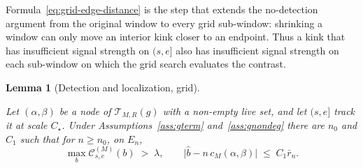 \documentclass[12pt, a4paper]{article}
\newtheorem{lemma}{Lemma}[section]
\begin{document}
Formula~\eqref{eq:grid-edge-distance} is the step that extends the no-detection
argument from the original window to every grid sub-window: shrinking a
window can only move an interior kink closer to an endpoint. Thus a kink that
has insufficient signal strength on $(s,e]$ also has insufficient signal
strength on each sub-window on which the grid search evaluates the contrast.

\begin{lemma}[Detection and localization, grid]
\label{lem:gloc}
\mbox{}\par
Let $(\alpha,\beta)$ be a node of $\mathcal{T}_{M,R}(g)$ with a non-empty live
set, and let $(s,e]$ track it at scale $C_\star$. Under
Assumptions~\ref{ass:gterm} and~\ref{ass:gnondeg} there are $n_0$ and $C_1$
such that for $n \ge n_0$, on $E_n$,
\[
\max_b \mathcal{C}^{(M)}_{s,e}(b) \;>\; \lambda,
\qquad
\big| \hat b - n\, c_M(\alpha,\beta) \big| \;\le\; C_1 \bar r_n .
\]
\end{lemma}
\end{document}
